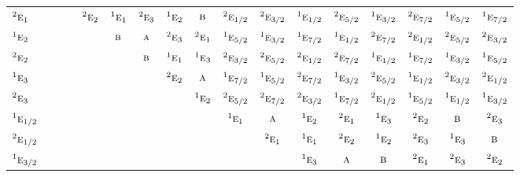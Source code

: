 \documentclass[10pt,a4paper]{article}
\numberwithin{equation}{section}
\newcommand{\irr}[1]{\text{\normalfont\scshape #1}}
\newcommand{\conjpair}[1]{{}^{#1}}
\begin{document}
{\begin{longtable}{@{}lcccccccccccccccc@{}}
$\conjpair{2}\irr{e}_{1}$ &  &  &  & $\conjpair{2}\irr{e}_{2}$ & $\conjpair{1}\irr{e}_{1}$ & $\conjpair{2}\irr{e}_{3}$ & $\conjpair{1}\irr{e}_{2}$ & $\irr{b}$ & $\conjpair{2}\irr{e}_{1/2}$ & $\conjpair{2}\irr{e}_{3/2}$ & $\conjpair{1}\irr{e}_{1/2}$ & $\conjpair{2}\irr{e}_{5/2}$ & $\conjpair{1}\irr{e}_{3/2}$ & $\conjpair{2}\irr{e}_{7/2}$ & $\conjpair{1}\irr{e}_{5/2}$ & $\conjpair{1}\irr{e}_{7/2}$\\
$\conjpair{1}\irr{e}_{2}$ &  &  &  &  & $\irr{b}$ & $\irr{a}$ & $\conjpair{2}\irr{e}_{3}$ & $\conjpair{2}\irr{e}_{1}$ & $\conjpair{1}\irr{e}_{5/2}$ & $\conjpair{1}\irr{e}_{3/2}$ & $\conjpair{1}\irr{e}_{7/2}$ & $\conjpair{1}\irr{e}_{1/2}$ & $\conjpair{2}\irr{e}_{7/2}$ & $\conjpair{2}\irr{e}_{1/2}$ & $\conjpair{2}\irr{e}_{5/2}$ & $\conjpair{2}\irr{e}_{3/2}$\\
$\conjpair{2}\irr{e}_{2}$ &  &  &  &  &  & $\irr{b}$ & $\conjpair{1}\irr{e}_{1}$ & $\conjpair{1}\irr{e}_{3}$ & $\conjpair{2}\irr{e}_{3/2}$ & $\conjpair{2}\irr{e}_{5/2}$ & $\conjpair{2}\irr{e}_{1/2}$ & $\conjpair{2}\irr{e}_{7/2}$ & $\conjpair{1}\irr{e}_{1/2}$ & $\conjpair{1}\irr{e}_{7/2}$ & $\conjpair{1}\irr{e}_{3/2}$ & $\conjpair{1}\irr{e}_{5/2}$\\
$\conjpair{1}\irr{e}_{3}$ &  &  &  &  &  &  & $\conjpair{2}\irr{e}_{2}$ & $\irr{a}$ & $\conjpair{1}\irr{e}_{7/2}$ & $\conjpair{1}\irr{e}_{5/2}$ & $\conjpair{2}\irr{e}_{7/2}$ & $\conjpair{1}\irr{e}_{3/2}$ & $\conjpair{2}\irr{e}_{5/2}$ & $\conjpair{1}\irr{e}_{1/2}$ & $\conjpair{2}\irr{e}_{3/2}$ & $\conjpair{2}\irr{e}_{1/2}$\\
$\conjpair{2}\irr{e}_{3}$ &  &  &  &  &  &  &  & $\conjpair{1}\irr{e}_{2}$ & $\conjpair{2}\irr{e}_{5/2}$ & $\conjpair{2}\irr{e}_{7/2}$ & $\conjpair{2}\irr{e}_{3/2}$ & $\conjpair{1}\irr{e}_{7/2}$ & $\conjpair{2}\irr{e}_{1/2}$ & $\conjpair{1}\irr{e}_{5/2}$ & $\conjpair{1}\irr{e}_{1/2}$ & $\conjpair{1}\irr{e}_{3/2}$\\
$\conjpair{1}\irr{e}_{1/2}$ &  &  &  &  &  &  &  &  & $\conjpair{1}\irr{e}_{1}$ & $\irr{a}$ & $\conjpair{1}\irr{e}_{2}$ & $\conjpair{2}\irr{e}_{1}$ & $\conjpair{1}\irr{e}_{3}$ & $\conjpair{2}\irr{e}_{2}$ & $\irr{b}$ & $\conjpair{2}\irr{e}_{3}$\\
$\conjpair{2}\irr{e}_{1/2}$ &  &  &  &  &  &  &  &  &  & $\conjpair{2}\irr{e}_{1}$ & $\conjpair{1}\irr{e}_{1}$ & $\conjpair{2}\irr{e}_{2}$ & $\conjpair{1}\irr{e}_{2}$ & $\conjpair{2}\irr{e}_{3}$ & $\conjpair{1}\irr{e}_{3}$ & $\irr{b}$\\
$\conjpair{1}\irr{e}_{3/2}$ &  &  &  &  &  &  &  &  &  &  & $\conjpair{1}\irr{e}_{3}$ & $\irr{a}$ & $\irr{b}$ & $\conjpair{2}\irr{e}_{1}$ & $\conjpair{2}\irr{e}_{3}$ & $\conjpair{2}\irr{e}_{2}$\\

\end{longtable}}
\end{document}
